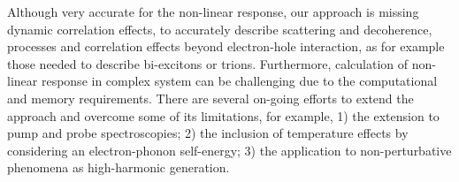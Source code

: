 Although very accurate for the non-linear response, our approach is missing dynamic correlation effects, to accurately describe scattering and decoherence, processes and correlation effects beyond electron-hole interaction, as for example those needed to describe bi-excitons or trions.\cite{schafer} Furthermore, calculation of non-linear response in complex system can be challenging due to the computational and memory requirements. 
There are several on-going efforts to extend the approach and overcome some of its limitations, for example, 1) the extension to pump and probe spectroscopies; 2) the inclusion of temperature effects by considering an electron-phonon self-energy; 3) the application to non-perturbative phenomena as high-harmonic generation.




